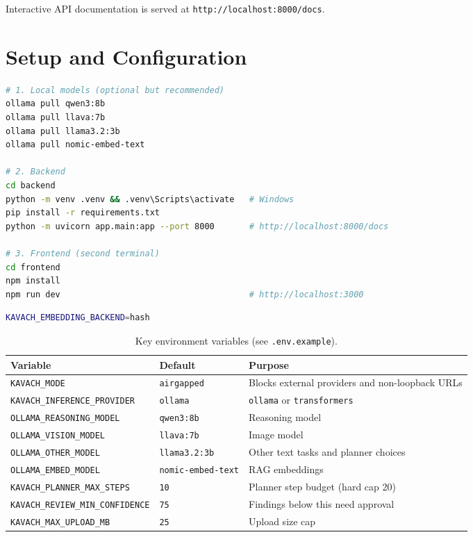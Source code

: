 \documentclass[11pt,a4paper]{article}
\begin{document}
\noindent Interactive API documentation is served at
\texttt{http://localhost:8000/docs}.

\section{Setup and Configuration}

\begin{lstlisting}[language=bash, caption={Local development (host defaults to local Ollama).}]
# 1. Local models (optional but recommended)
ollama pull qwen3:8b
ollama pull llava:7b
ollama pull llama3.2:3b
ollama pull nomic-embed-text

# 2. Backend
cd backend
python -m venv .venv && .venv\Scripts\activate   # Windows
pip install -r requirements.txt
python -m uvicorn app.main:app --port 8000       # http://localhost:8000/docs

# 3. Frontend (second terminal)
cd frontend
npm install
npm run dev                                      # http://localhost:3000
\end{lstlisting}

\begin{lstlisting}[language=bash, caption={Local lexical retrieval without an embedding model.}]
KAVACH_EMBEDDING_BACKEND=hash
\end{lstlisting}

\begin{table}[htbp]
\centering
\small
\begin{tabular}{@{}p{5.4cm} p{3.4cm} p{5.4cm}@{}}
\toprule
\textbf{Variable} & \textbf{Default} & \textbf{Purpose} \\
\midrule
\texttt{KAVACH\_MODE} & \texttt{airgapped} & Blocks external providers and non-loopback URLs \\
\texttt{KAVACH\_INFERENCE\_PROVIDER} & \texttt{ollama} & \texttt{ollama} or \texttt{transformers} \\
\texttt{OLLAMA\_REASONING\_MODEL} & \texttt{qwen3:8b} & Reasoning model \\
\texttt{OLLAMA\_VISION\_MODEL} & \texttt{llava:7b} & Image model \\
\texttt{OLLAMA\_OTHER\_MODEL} & \texttt{llama3.2:3b} & Other text tasks and planner choices \\
\texttt{OLLAMA\_EMBED\_MODEL} & \texttt{nomic-embed-text} & RAG embeddings \\
\texttt{KAVACH\_PLANNER\_MAX\_STEPS} & \texttt{10} & Planner step budget (hard cap 20) \\
\texttt{KAVACH\_REVIEW\_MIN\_CONFIDENCE} & \texttt{75} & Findings below this need approval \\
\texttt{KAVACH\_MAX\_UPLOAD\_MB} & \texttt{25} & Upload size cap \\
\bottomrule
\end{tabular}
\caption{Key environment variables (see \texttt{.env.example}).}
\end{table}
\end{document}
